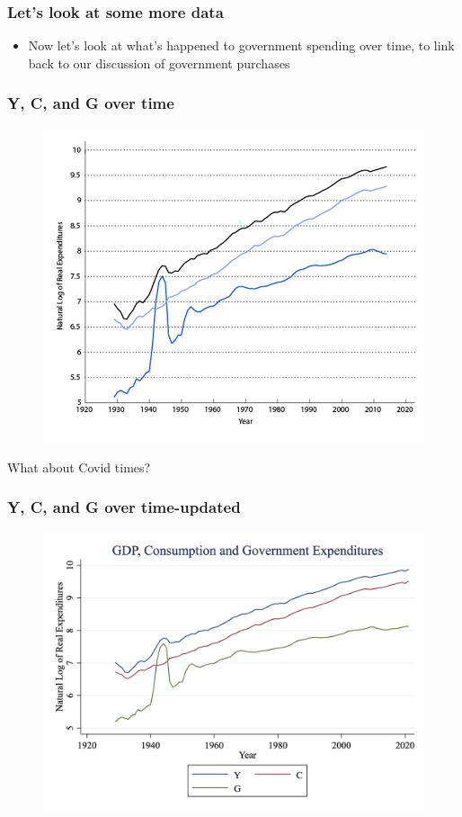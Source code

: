 \documentclass{beamer}
\begin{document}
\begin{frame}
\frametitle[alignment=center]{Let's look at some more data}
\begin{itemize}
\item Now let's look at what's happened to government spending over time, to link back to our discussion of government purchases
\end{itemize}
\end{frame}




\begin{frame}
\frametitle[alignment=center]{Y, C, and G over time}
\begin{figure}
\centering
\includegraphics[scale=0.5]{Figures/W_Fig_5pt7.png}
\end{figure}
What about Covid times?
\end{frame}

\begin{frame}
\frametitle[alignment=center]{Y, C, and G over time-updated}
\begin{figure}
\centering
\includegraphics[scale=0.2]{Figures/Y_C_G.png}
\end{figure}
\end{frame}
\end{document}
